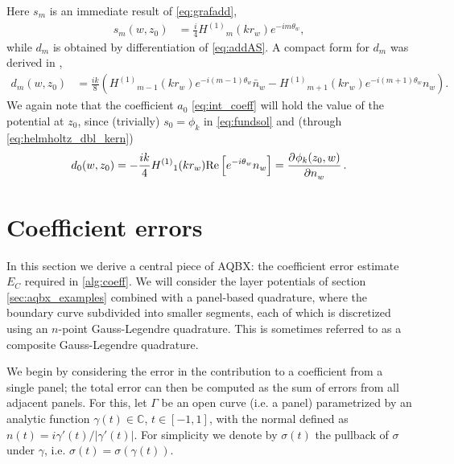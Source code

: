 \documentclass[hidelinks]{siamart1116}
\begin{document}
Here ${s}_m$ is an immediate result of \eqref{eq:grafadd},
\begin{align}
  {s}_m(w, z_0) &= \frac{i}{4} {H^{(1)}}_m(kr_w) e^{-im\theta_w},
                     \label{eq:addAS}
\end{align}
while ${d}_m$ is obtained by differentiation of \eqref{eq:addAS}. A
compact form for ${d}_m$ was derived in \cite{Barnett2014},
\begin{align}
  {d}_m(w, z_0) &= \frac{ik}{8} \left(
                     {H^{(1)}}_{m-1}(kr_w) e^{-i(m-1)\theta_w} {\bar{n}}_w
                     -{H^{(1)}}_{m+1}(kr_w) e^{-i(m+1)\theta_w} n_w
                     \right) .
                     \label{eq:addAD}
\end{align}
We again note that the coefficient $a_0$ \eqref{eq:int_coeff} will
hold the value of the potential at $z_0$, since (trivially)
${s}_0 = \phi_k$ in \eqref{eq:fundsol} and (through
\eqref{eq:helmholtz_dbl_kern})
\begin{equation}
    {d}_0(w, z_0) =
    -\frac{ik}{4} {H^{(1)}}_{1}(kr_w) {\operatorname{Re}} \left[
      e^{-i\theta_w} n_w
    \right] 
    = \dpd{\phi_k(z_0, w)}{n_w} .
  \label{eq:addADzero}
\end{equation}

\section{Coefficient errors}
\label{sec:quadrature-errors}

In this section we derive a central piece of AQBX: the coefficient
error estimate ${E_C}$ required in \cref{alg:coeff}. We will
consider the layer potentials of section \ref{sec:aqbx_examples}
combined with a panel-based quadrature, where the boundary curve
subdivided into smaller segments, each of which is discretized using
an $n$-point Gauss-Legendre quadrature. This is sometimes referred to
as a composite Gauss-Legendre quadrature.

We begin by considering the error in the contribution to a coefficient
from a single panel; the total error can then be computed as the sum
of errors from all adjacent panels. For this, let $\Gamma$ be an open
curve (i.e. a panel) parametrized by an analytic function
${\gamma}(t) \in \mathbb{C}$, $t\in[-1,1]$, with the normal defined as
$n(t)=i{\gamma}'(t) / |{\gamma}'(t)|$. For simplicity we denote by
${\sigma}(t)$ the pullback of ${\sigma}$ under $\gamma$, i.e.
${{\sigma}}(t) = {\sigma}({\gamma}(t))$.
\end{document}
